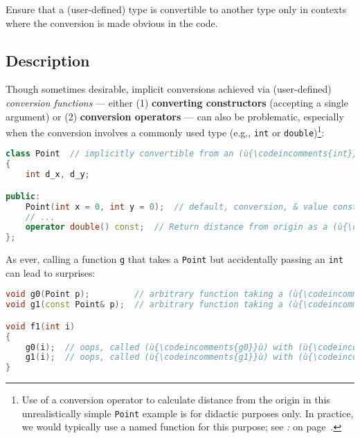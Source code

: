 

Ensure that a (user-defined) type is convertible to another type only in
contexts where the conversion is made obvious in the code.

\subsection[Description]{Description}\label{description-explicitconv}

Though sometimes desirable, implicit conversions achieved via (user-defined) \emph{conversion
functions} --- either (1) \textbf{converting constructors} (accepting a
single argument) or (2) \textbf{conversion operators} --- can also be problematic, especially when the
conversion involves a commonly used type (e.g., \texttt{int} or
\texttt{double}){\cprotect\footnote{Use of a conversion operator to
calculate distance from the origin in this unrealistically simple \texttt{Point}
example is for didactic purposes only. In practice, we would typically
use a named function for this purpose; see {\it{}: } on page~\pageref{sometimes-a-named-function-is-better}.}}:

\begin{lstlisting}[language=C++]
class Point  // implicitly convertible from an (ù{\codeincomments{int}}ù) or to a (ù{\codeincomments{double}}ù)
{
    int d_x, d_y;

public:
    Point(int x = 0, int y = 0);  // default, conversion, & value constructor
    // ...
    operator double() const;  // Return distance from origin as a (ù{\codeincomments{double}}ù).
};
\end{lstlisting}
    
\noindent As ever, calling a function \texttt{g} that takes a \texttt{Point} but
accidentally passing an \texttt{int} can lead to surprises:

\begin{lstlisting}[language=C++]
void g0(Point p);         // arbitrary function taking a (ù{\codeincomments{Point}}ù) object by value
void g1(const Point& p);  // arbitrary function taking a (ù{\codeincomments{Point}}ù) by (ù{\codeincomments{const}}ù) reference

void f1(int i)
{
    g0(i);  // oops, called (ù{\codeincomments{g0}}ù) with (ù{\codeincomments{Point(i, 0)}}ù) by mistake
    g1(i);  // oops, called (ù{\codeincomments{g1}}ù) with (ù{\codeincomments{Point(i, 0)}}ù) by mistake
}
\end{lstlisting}
    
